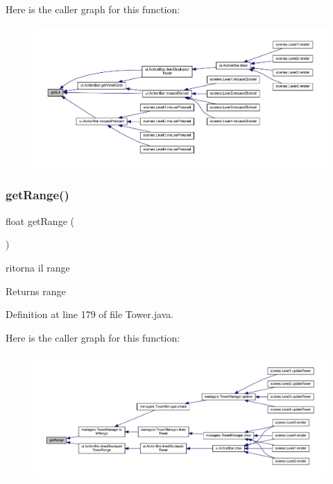 Here is the caller graph for this function\+:\nopagebreak
\begin{figure}[H]
\begin{center}
\leavevmode
\includegraphics[width=350pt]{classtowers_1_1_tower_a69ffaa5d69141ba9aed07daf94b18540_icgraph}
\end{center}
\end{figure}
\mbox{\label{classtowers_1_1_tower_a18d1640fde65c20187e68286b6bbcf6d}} 
\subsubsection{\texorpdfstring{get\+Range()}{getRange()}}
{\footnotesize\ttfamily float get\+Range (\begin{DoxyParamCaption}{ }\end{DoxyParamCaption})}



ritorna il range 

\begin{DoxyReturn}{Returns}
range 
\end{DoxyReturn}


Definition at line 179 of file Tower.\+java.

Here is the caller graph for this function\+:\nopagebreak
\begin{figure}[H]
\begin{center}
\leavevmode
\includegraphics[width=350pt]{classtowers_1_1_tower_a18d1640fde65c20187e68286b6bbcf6d_icgraph}
\end{center}
\end{figure}
\mbox{\label{classtowers_1_1_tower_adaa3345598ef202753372f185625e5da}} 
